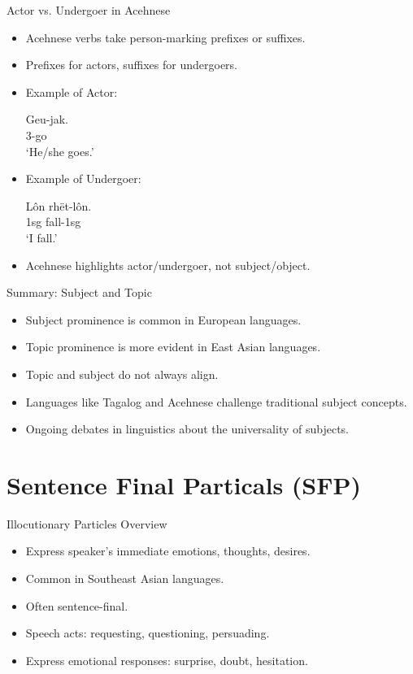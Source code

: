 \documentclass{beamer}
\begin{document}
\begin{frame}{Actor vs. Undergoer in Acehnese}
  \begin{itemize}
    \item Acehnese verbs take person-marking prefixes or suffixes.
    \item Prefixes for actors, suffixes for undergoers.
    \item Example of Actor:
    \begin{example}
    \gll Geu-jak. \\
         3-go \\
    \trans ‘He/she goes.’
    \end{example}
    \item Example of Undergoer:
    \begin{example}
    \gll Lôn rhët-lôn. \\
         1sg fall-1sg \\
    \trans ‘I fall.’
    \end{example}
    \item Acehnese highlights actor/undergoer, not subject/object.
  \end{itemize}
\end{frame}

\begin{frame}{Summary: Subject and Topic}
  \begin{itemize}
    \item Subject prominence is common in European languages.
    \item Topic prominence is more evident in East Asian languages.
    \item Topic and subject do not always align.
    \item Languages like Tagalog and Acehnese challenge traditional subject concepts.
    \item Ongoing debates in linguistics about the universality of subjects.
  \end{itemize}
\end{frame}


\section{Sentence Final Particals (SFP)}

\begin{frame}{Illocutionary Particles Overview}
  \begin{itemize}
    \item Express speaker's immediate emotions, thoughts, desires.
    \item Common in Southeast Asian languages.
    \item Often sentence-final.
    \item Speech acts: requesting, questioning, persuading.
    \item Express emotional responses: surprise, doubt, hesitation.
  \end{itemize}
\end{frame}
\end{document}
